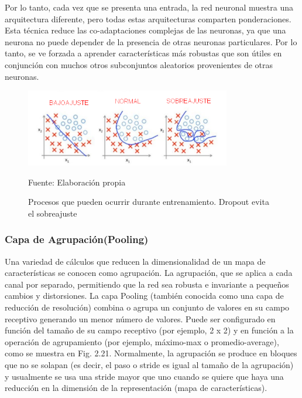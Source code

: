 		\vskip 0.4cm 
		Por lo tanto, cada vez que se presenta una entrada, la red neuronal muestra una arquitectura diferente, pero todas estas arquitecturas comparten ponderaciones. Esta técnica reduce las co-adaptaciones complejas de las neuronas, ya que una neurona no puede depender de la presencia de otras neuronas particulares. Por lo tanto, se ve forzada a aprender características más robustas que son útiles en conjunción con muchos otros subconjuntos aleatorios provenientes de otras neuronas.
		\begin{figure}[H]
		\begin{center}
		\includegraphics[width=0.8\textwidth]{images/marcoteorico/dropout}
		\end{center}
		\begin{center}
		\caption{\small{Procesos que pueden ocurrir durante entrenamiento. Dropout evita el sobreajuste}}
		\vskip -0.3cm  
		{\small{Fuente: Elaboración propia}}
		\end{center}
		\vspace{-1.5em}
		\end{figure}

		\vskip 0.4cm 
	\subsubsection {Capa de Agrupación(Pooling)}
		\vskip 0.4cm 

		Una variedad de cálculos que reducen la dimensionalidad de un mapa de características se conocen como agrupación. La agrupación, que se aplica a cada canal por separado, permitiendo que la red sea robusta e invariante a pequeños cambios y distorsiones. La capa Pooling (también conocida como una capa de reducción de resolución) combina o agrupa un conjunto de valores en su campo receptivo generando un menor número de valores. Puede ser configurado en función del tamaño de su campo receptivo (por ejemplo, 2 x 2) y en función a la operación de agrupamiento (por ejemplo, máximo-max o promedio-average), como se muestra en Fig. 2.21. Normalmente, la agrupación se produce en bloques que no se solapan (es decir, el paso o stride es igual al tamaño de la agrupación) y usualmente se usa una stride mayor que uno cuando se quiere que haya una reducción en la dimensión de la representación (mapa de características).


